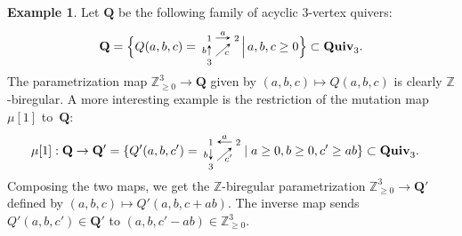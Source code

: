 \documentclass[11pt, letterpaper]{amsart}
\theoremstyle{definition}
\newtheorem{example}[theorem]{Example}
\numberwithin{equation}{section}
\def\ZZ{{\mathbb Z}}
\def\Quiv {{\mathbf{Quiv}}}
\begin{document}
\begin{example}
\label{eg:QQ'}
Let $\mathbf{Q}$ be the following family of acyclic 3-vertex quivers:
\begin{equation*}
\mathbf{Q}=\Bigl\{
Q(a,b,c)=
\begin{tikzcd}[arrows={-stealth}, sep=small, cramped]
  \scriptstyle 1 \arrow[r, "a"]  
  & \scriptstyle 2 
  \\
  \scriptstyle 3 \arrow[u,"b"] \arrow[ur, swap, "c" , outer sep=-1pt] &
\end{tikzcd}
\,\Bigl| \, a,b,c\ge 0
\Bigr\}\subset\Quiv_3. 
\end{equation*}
The parametrization map $\ZZ_{\ge0}^3\to\mathbf{Q}$ given by $(a,b,c)\mapsto Q(a,b,c)$ is clearly $\ZZ$-biregular. 
A more interesting example is the restriction of the mutation map $\mu[1]$ to~$\mathbf{Q}$: 
\begin{align*}
\mu[1]: \mathbf{Q}&\to\mathbf{Q'}=\{Q'(a,b,c')=\begin{tikzcd}[arrows={-stealth}, sep=small, cramped, ampersand replacement=\&]
  \scriptstyle 1    \arrow[d, swap, "b"] 
  \& \scriptstyle 2 \arrow[l, swap, "a" ]  
  \\
   \scriptstyle 3 \arrow[ur, swap, "{c'}", outer sep=-2pt] \&
\end{tikzcd} \mid a\ge 0, b\ge 0, c'\ge ab\}\subset\Quiv_3. 
\end{align*}
Composing the two maps, we get the $\ZZ$-biregular parametrization $\ZZ^3_{\ge0}\to\mathbf{Q'}$ defined by
$(a,b,c)\mapsto Q'(a,b,c+ab)$. 
The inverse map sends $Q'(a,b,c')\in \mathbf{Q'}$ to $(a,b,c'-ab)\in\ZZ^3_{\ge0}$. 
\end{example}
\end{document}
